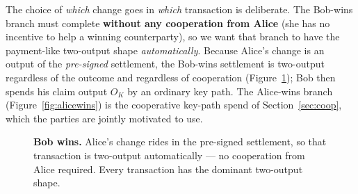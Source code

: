 \documentclass[11pt]{article}
\begin{document}
The choice of \emph{which} change goes in \emph{which} transaction is deliberate. The Bob-wins branch must complete \textbf{without any cooperation from Alice} (she has no incentive to help a winning counterparty), so we want that branch to have the payment-like two-output shape \emph{automatically}. Because Alice's change is an output of the \emph{pre-signed} settlement, the Bob-wins settlement is two-output regardless of the outcome and regardless of cooperation (Figure~\ref{fig:bobwins}); Bob then spends his claim output $O_K$ by an ordinary key path. The Alice-wins branch (Figure~\ref{fig:alicewins}) is the cooperative key-path spend of Section~\ref{sec:coop}, which the parties are jointly motivated to use.

\begin{figure}[h]
\centering
{}
\caption{\textbf{Bob wins.} Alice's change rides in the pre-signed settlement, so that transaction is two-output automatically --- no cooperation from Alice required. Every transaction has the dominant two-output shape.}
\label{fig:bobwins}
\end{figure}
\end{document}
